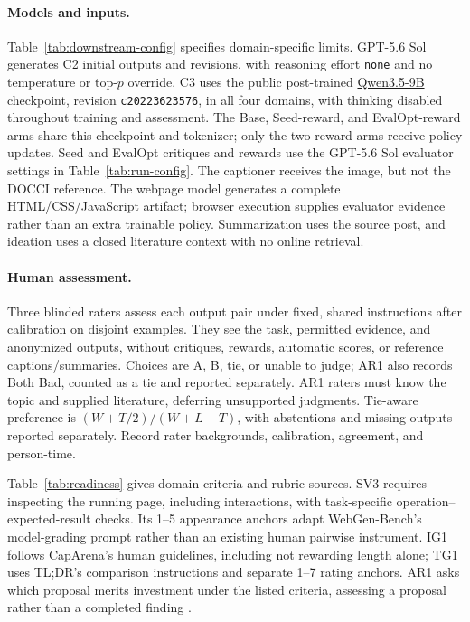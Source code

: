 \paragraph{Models and inputs.}
Table~\ref{tab:downstream-config} specifies domain-specific limits.
GPT-5.6 Sol generates C2 initial outputs and revisions, with reasoning effort \texttt{none} and no temperature or top-$p$ override.
C3 uses the public post-trained \href{https://huggingface.co/Qwen/Qwen3.5-9B}{Qwen3.5-9B} checkpoint, revision \texttt{c20223623576}, in all four domains, with thinking disabled throughout training and assessment.
The Base, Seed-reward, and EvalOpt-reward arms share this checkpoint and tokenizer; only the two reward arms receive policy updates.
Seed and EvalOpt critiques and rewards use the GPT-5.6 Sol evaluator settings in Table~\ref{tab:run-config}.
The captioner receives the image, but not the DOCCI reference.
The webpage model generates a complete HTML/CSS/JavaScript artifact; browser execution supplies evaluator evidence rather than an extra trainable policy.
Summarization uses the source post, and ideation uses a closed literature context with no online retrieval.

\paragraph{Human assessment.}
Three blinded raters assess each output pair under fixed, shared instructions after calibration on disjoint examples.
They see the task, permitted evidence, and anonymized outputs, without critiques, rewards, automatic scores, or reference captions/summaries.
Choices are A, B, tie, or unable to judge; AR1 also records Both Bad, counted as a tie and reported separately.
AR1 raters must know the topic and supplied literature, deferring unsupported judgments.
Tie-aware preference is $(W+T/2)/(W+L+T)$, with abstentions and missing outputs reported separately.
Record rater backgrounds, calibration, agreement, and person-time.

Table~\ref{tab:readiness} gives domain criteria and rubric sources.
SV3 requires inspecting the running page, including interactions, with task-specific operation--expected-result checks.
Its 1--5 appearance anchors adapt WebGen-Bench's model-grading prompt rather than an existing human pairwise instrument.
IG1 follows CapArena's human guidelines, including not rewarding length alone; TG1 uses TL;DR's comparison instructions and separate 1--7 rating anchors.
AR1 asks which proposal merits investment under the listed criteria, assessing a proposal rather than a completed finding \citep{si2025ideas}.

